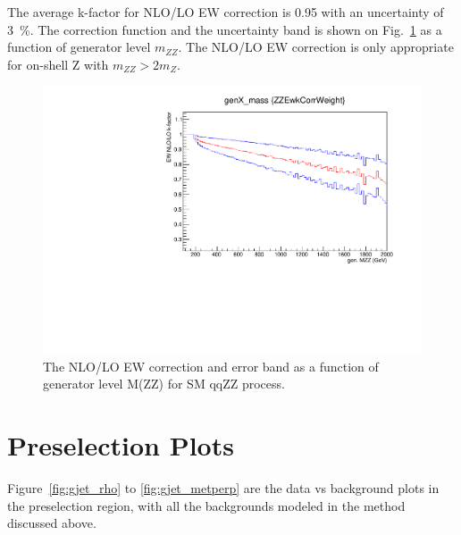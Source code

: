 \vspace{0.3cm}
The average k-factor for NLO/LO EW correction is 0.95 with an uncertainty of 3~\%. 
The correction function and the uncertainty band is shown on Fig.~\ref{fig:qqzz_nlo_ew}
as a function of generator level $m_{ZZ}$. 
The NLO/LO EW correction is only appropriate for on-shell Z with $m_{ZZ}>2 m_{Z}$. 

\begin{figure}[htbp!]
\centering
  \includegraphics[width=0.48\linewidth]{figures/ewkfactor.pdf}
  \caption{The NLO/LO EW correction and error band as a function of generator level M(ZZ) for SM qqZZ process.}
  \label{fig:qqzz_nlo_ew}
\end{figure}

\section{Preselection Plots}
Figure~\ref{fig:gjet_rho} to \ref{fig:gjet_metperp} are the data vs background plots in the preselection region, with all the backgrounds modeled in the method discussed above. 

